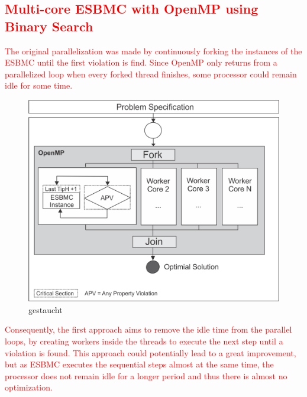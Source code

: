 \subsection{\textcolor{Red}{Multi-core ESBMC with OpenMP using Binary Search}}

\textcolor{Red}{The original parallelization was made by continuously forking the instances of the ESBMC until the first violation is find. Since OpenMP only returns from a parallelized loop when every forked thread finishes, some processor could remain idle for some time.}

\begin{figure}[ht]
	\centering
  \includegraphics[scale=0.75]{Image/esbmc-parallel.png} 
	\caption{gestaucht}
	\label{fig2}
\end{figure}

\textcolor{Red}{Consequently, the first approach aims to remove the idle time from the parallel loops, by creating workers inside the threads to execute the next step until a violation is found. This approach could potentially lead to a great improvement, but as ESBMC executes the sequential steps almost at the same time, the processor does not remain idle for a longer period and thus there is almost no optimization.}

